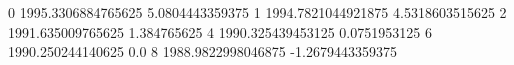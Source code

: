 0 1995.3306884765625 5.0804443359375
1 1994.7821044921875 4.5318603515625
2 1991.635009765625 1.384765625
4 1990.325439453125 0.0751953125
6 1990.250244140625 0.0
8 1988.9822998046875 -1.2679443359375
